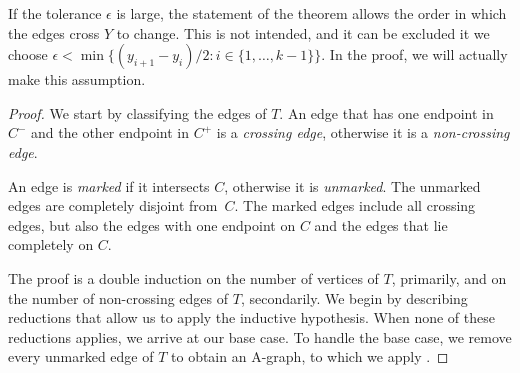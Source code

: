 If the tolerance $\epsilon$ is large, 
the statement of the theorem allows the order in which the edges cross
$Y$ to change. This is not intended, and it can be excluded it we choose
$\epsilon<\min\{(y_{i+1}-y_i)/2:i\in\{1,\ldots,k-1\}\}$. In the proof,
we will actually make this assumption.

\begin{proof}
  We start by classifying the edges of $T$.  An edge that has one
  endpoint in $C^-$ and the other endpoint in $C^+$ is a \emph{crossing
    edge}, otherwise it is a \emph{non-crossing edge}.

  An edge
  is \emph{marked} if it intersects $C$, otherwise it is
  \emph{unmarked}.  The unmarked edges are completely disjoint
  from~$C$.  The marked edges include all crossing edges, but also the
  edges with one endpoint on $C$ and the edges that lie completely on
  $C$.
	
	
	
	The proof is a double induction on the number of vertices of $T$, primarily, and on the number of non-crossing edges of $T$, secondarily.
	We begin by describing reductions that allow us to apply the
	inductive hypothesis. When none of these reductions applies,
	we arrive at our base case. To handle the base case,
	we remove every unmarked edge of $T$ to obtain an A-graph, to which we
	apply .


\end{proof}
